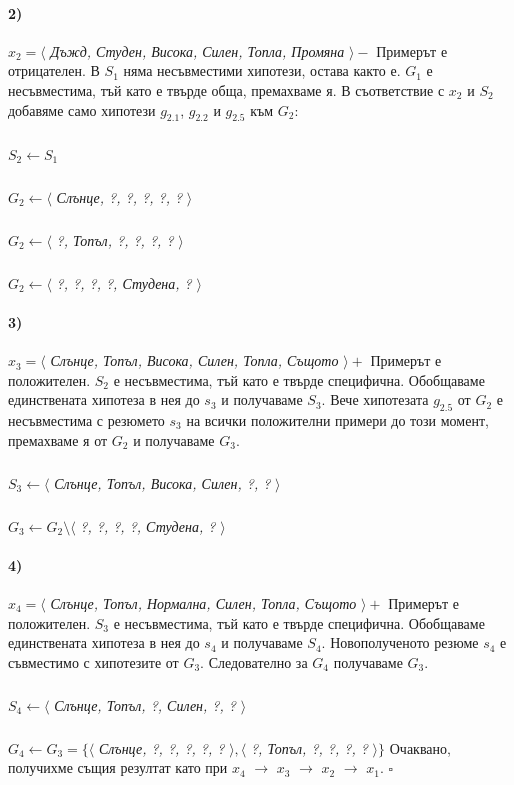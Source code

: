 \documentclass[12pt]{article}
\begin{document}
	\paragraph{2)} $x_{2} = \langle $ \textit{Дъжд, Студен, Висока, Силен, Топла, Промяна} $\rangle  -$ \newline\newline
	Примерът е отрицателен. В $S_{1}$ няма несъвместими хипотези, остава както е. $G_{1}$ е несъвместима, тъй като е твърде обща, премахваме я. В съответствие с $x_{2}$ и $S_{2}$ добавяме само хипотези $g_{2.1}$, $g_{2.2}$ и $g_{2.5}$ към $G_{2}$:
		\subparagraph{}
		$S_{2} \leftarrow S_{1}$
		\subparagraph{} 
		$G_{2} \leftarrow \langle $ \textit{Слънце, ?, ?, ?, ?, ?} $ \rangle$
		\subparagraph{} 
		$G_{2} \leftarrow \langle $ \textit{?, Топъл, ?, ?, ?, ?} $ \rangle$
		\subparagraph{} 
		$G_{2} \leftarrow \langle $ \textit{?, ?, ?, ?, Студена, ?} $ \rangle$
	
	\paragraph{3)} $x_{3} = \langle $ \textit{Слънце, Топъл, Висока, Силен, Топла, Същото} $\rangle  +$ \newline\newline
	Примерът е положителен. $S_{2}$ е несъвместима, тъй като е твърде специфична. Обобщаваме единствената хипотеза в нея до $s_{3}$ и получаваме $S_{3}$. Вече хипотезата $g_{2.5}$ от $G_{2}$ е несъвместима с резюмето $s_{3}$ на всички положителни примери до този момент, премахваме я от $G_{2}$ и получаваме $G_{3}$.
		\subparagraph{}
		$S_{3} \leftarrow \langle $ \textit{Слънце, Топъл, Висока, Силен, ?, ?} $ \rangle $
		\subparagraph{} 
		$G_{3} \leftarrow G_{2} \setminus \langle $ \textit{?, ?, ?, ?, Студена, ?} $ \rangle$
		
	\paragraph{4)} $x_{4} = \langle $ \textit{Слънце, Топъл, Нормална, Силен, Топла, Същото} $\rangle  +$ \newline\newline
	Примерът е положителен. $S_{3}$ е несъвместима, тъй като е твърде специфична. Обобщаваме единствената хипотеза в нея до $s_{4}$ и получаваме $S_{4}$. Новополученото резюме $s_{4}$ е съвместимо с хипотезите от $G_{3}$. Следователно за $G_{4}$ получаваме $G_{3}$.
		\subparagraph{}
		$S_{4} \leftarrow \langle $ \textit{Слънце, Топъл, ?, Силен, ?, ?} $ \rangle $
		\subparagraph{} 
		$G_{4} \leftarrow G_{3} = \{ \langle $ \textit{Слънце, ?, ?, ?, ?, ?} $ \rangle, \langle $ \textit{?, Топъл, ?, ?, ?, ?} $ \rangle \}$
	\newline
	Очаквано, получихме същия резултат като при $x_{4}$ $\rightarrow$ $x_{3}$ $\rightarrow$ $x_{2}$ $\rightarrow$ $x_{1}$. $\square$
	
\end{document}
